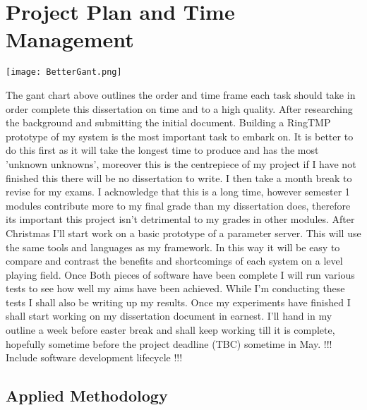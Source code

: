 \clearpage
\section{Project Plan and Time Management}

\texttt{[image: BetterGant.png]}

The gant chart above outlines the order and time frame each task should take in
order complete this dissertation on time and to a high quality. After
researching the background and submitting the initial document. Building a
RingTMP prototype of my system is the most important task to embark on. It is
better to do this first as it will take the longest time to produce and has the
most 'unknown unknowns', moreover this is the centrepiece of my project if I
have not finished this there will be no dissertation to write. I then take a
month break to revise for my exams. I acknowledge that this is a long time,
however semester 1 modules contribute more to my final grade than my
dissertation does, therefore its important this project isn't detrimental to my
grades in other modules. After Christmas I'll start work on a basic prototype of
a parameter server. This will use the same tools and languages as my framework.
In this way it will be easy to compare and contrast the benefits and
shortcomings of each system on a level playing field. Once Both pieces of
software have been complete I will run various tests to see how well my aims
have been achieved. While I'm conducting these tests I shall also be writing up
my results. Once my experiments have finished I shall start working on my
dissertation document in earnest. I'll hand in my outline a week before easter
break and shall keep working till it is complete, hopefully sometime before the
project deadline (TBC) sometime in May.
\newline
!!! Include software development lifecycle !!!

\subsection{Applied Methodology}

